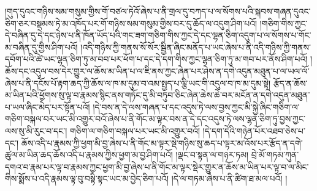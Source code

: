 །གུད་དུའང་གཉིས་སམ་གསུམ་གྱིས་གོ་བཙལ་ཏེའོ་ཞེས་པ་ནི་གྲལ་དུ་བཀད་པ་ལ་སོགས་པའི་སྐབས་གཞན་དུའང་ཅིག་ཅར་བསྡམས་ཏེ་མ་འཁོད་པར་གོ་གཉིས་སམ་གསུམ་གྱིས་བར་དུ་ཆོད་ལ་འདུག་ཤིག་པའོ། །གཅིག་གིས་ཀྱང་དེ་བཞིན་དུ་དེ་དང་ཉེས་པ་ནི་ཁོན་ཡོད་པའི་གང་ཟག་གཅིག་གིས་ཀྱང་དེ་དང་ལྷན་ཅིག་འདུག་པ་ལ་སོགས་པ་གོང་མ་བཞིན་དུ་གྱིས་ཤིག་པའོ། །འདི་གཉིས་ཀྱི་གནས་སོ་སོར་སྦྱིན་ཞིང་མནོད་པ་ཡང་ཞེས་པ་ནི་འདི་གཉིས་ཀྱི་གནས་དབོག་པའི་ཚེ་ཡང་ལྷན་ཅིག་ཏུ་མ་བབ་པར་ཕོག་པ་དང་དེ་དག་གིས་ཀྱང་ལྷན་ཅིག་ཏུ་མ་གབ་པར་ནོས་ཤིག་པའོ། །ཆོས་དང་འདུལ་བས་དེར་གྱུར་ལ་ཆོས་མ་ཡིན་པ་ལ་ཇི་ནས་ཀྱང་ཞེན་པར་ཤེས་ན་དགེ་འདུན་མཐུན་པ་ལ་ཡལ་ལོ་ཞེས་པ་ནི་དངོས་པོ་རྟག་ཆད་ཀྱི་ཆོས་ལ་ཁ་མ་དུམ་བ་འམ་སྤྱད་པ་ལྕི་ཡང་གི་འདུལ་བ་ཁ་མ་དུམ་སྟེ། རྩོད་ན་ཆོས་མ་ཡིན་པའི་ཕྱོགས་སུ་ལྟ་བ་རྣམས་སྙིང་ནས་གཏོང་དུ་མི་བཏུབ་ཅིང་ཞེན་ཆེས་ཆེ་བར་མངོན་ན་དགེ་འདུན་མཐུན་པ་ཡལ་ཞིང་མེད་པར་སྟོན་པའོ། །དེ་བས་ན་དེ་ལས་གཞན་པ་དང་འདུས་ཏེ་ལས་བྱས་ཀྱང་མི་སྐྱེ་ཞིང་གཅིག་ལ་གཅིག་བསྐལ་བར་ཡང་མི་འགྱུར་བའོ་ཞེས་པ་ནི་གོང་མ་ལྟར་བས་ན་དེ་དང་འདུས་ཏེ་ལས་ལྷན་ཅིག་ཏུ་བྱས་ཀྱང་ལས་སུ་མི་རུང་བ་དང་། གཅིག་ལ་གཅིག་བསྐལ་པར་ཡང་མི་འགྱུར་བའོ། །དེ་དག་དེའི་གཉེན་པོར་འཐབ་ཅེས་པ་དང་། ཆོས་འདི་པ་རྣམས་ཀྱི་ཕྱག་མི་བྱ་ཞེས་པ་ནི་གོང་མ་ལྟར་སྡེ་གཉིས་སུ་ཆད་པ་ལྟར་མ་འོས་པར་རྩོད་ན་དགེ་ཚུལ་མ་ཡིན་ཆད་ཆོས་འདི་པ་རྣམས་ཀྱིས་ཕྱག་མ་བྱ་ཤིག་པའོ། །ལྡང་བ་སྟན་ལ་གཉར་ཏམ། བྲེ་མོ་གཏམ་ཀུན་དགའ་བ་རྣམ་པར་ལྟ་བ་རྣམས་ཀྱང་ཕྱག་མི་བྱ་ཞེས་པ་ནི་གོང་མ་ལྟར་སྡེར་གྱུར་ན་ཆོས་མ་ཡིན་པར་ལྟ་བ་ལ་མིང་གིས་སྨོས་པ་འདི་རྣམས་ལྟ་བུ་བསྟི་སྟང་ཡང་མ་བྱེད་ཅིག་པའོ། །དེ་ལ་གཏམ་ཞེས་པ་ནི་ཚིག་ཐ་མལ་པའོ། །
